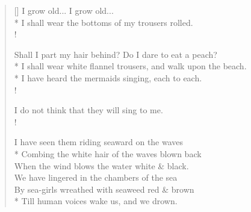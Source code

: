 \documentclass[MAIN]{subfiles}
\begin{document}
\begin{verse}[\versewidth]
I grow old... I grow old...\\* 
I shall wear the bottoms of my trousers rolled.\\!

Shall I part my hair behind? Do I dare to eat a peach?\\*
I shall wear white flannel trousers, and walk upon the beach.\\*
I have heard the mermaids singing, each to each.\\!

I do not think that they will sing to me.\\!

I have seen them riding seaward on the waves\\*
Combing the white hair of the waves blown back\\
When the wind blows the water white \& black.\\
We have lingered in the chambers of the sea\\ 
By sea-girls wreathed with seaweed red \& brown\\* 
Till human voices wake us, and we drown.
\end{verse}
\end{document}
